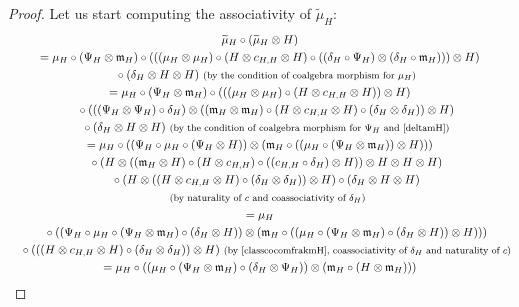 \documentclass[10pt,a4paper]{amsart}
\numberwithin{equation}{section}
\begin{document}
\begin{proof}
Let us start computing the associativity of $\widetilde{\mu}_{H}$:
\begin{gather*}
\widetilde{\mu}_{H}\circ(\widetilde{\mu}_{H}\otimes H)\\
= \mu_{H}\circ(\Psi_{H}\otimes \mathfrak{m}_{H})\circ(((\mu_{H}\otimes\mu_{H})\circ(H\otimes c_{H,H}\otimes H)\circ((\delta_{H}\circ\Psi_{H})\otimes(\delta_{H}\circ \mathfrak{m}_{H})))\otimes H)\\
\quad{}\circ(\delta_{H}\otimes H\otimes H)\ \text{\footnotesize\textnormal{(by the condition of coalgebra morphism for $\mu_{H}$)}}\\
= \mu_{H}\circ(\Psi_{H}\otimes \mathfrak{m}_{H})\circ (((\mu_{H}\otimes \mu_{H})\circ(H\otimes c_{H,H}\otimes H))\otimes H)\\
\quad{}\circ (((\Psi_{H}\otimes \Psi_{H})\circ\delta_{H})\otimes((\mathfrak{m}_{H}\otimes \mathfrak{m}_{H})\circ(H\otimes c_{H,H}\otimes H)\circ(\delta_{H}\otimes\delta_{H}))\otimes H)\\
\quad{}\circ(\delta_{H}\otimes H\otimes H)\ \text{\footnotesize\textnormal{(by the condition of coalgebra morphism for $\Psi_{H}$ and \eqref{deltamH})}}\\
= \mu_{H}\circ ((\Psi_{H}\circ\mu_{H}\circ(\Psi_{H}\otimes H))\otimes(\mathfrak{m}_{H}\circ((\mu_{H}\circ(\Psi_{H}\otimes \mathfrak{m}_{H}))\otimes H)))\\
\quad{}\circ(H\otimes ((\mathfrak{m}_{H}\otimes H)\circ (H\otimes c_{H,H})\circ((c_{H,H}\circ\delta_{H})\otimes H))\otimes H\otimes H\otimes H)\\
\quad{}\circ(H\otimes((H\otimes c_{H,H}\otimes H)\circ(\delta_{H}\otimes\delta_{H}))\otimes H)\circ(\delta_{H}\otimes H\otimes H)\\
\quad{}\ \text{\footnotesize\textnormal{(by naturality of $c$ and coassociativity of $\delta_{H}$)}}\\
= \mu_{H}\\
\quad{}\circ((\Psi_{H}\circ\mu_{H}\circ (\Psi_{H}\otimes \mathfrak{m}_{H})\circ(\delta_{H}\otimes H))\otimes(\mathfrak{m}_{H}\circ((\mu_{H}\circ(\Psi_{H}\otimes \mathfrak{m}_{H})\circ(\delta_{H}\otimes H))\otimes H)))\\
\quad{} \circ(((H\otimes c_{H,H}\otimes H)\circ(\delta_{H}\otimes\delta_{H}))\otimes H)\ \text{\footnotesize\textnormal{(by \eqref{classcocomfrakmH}, coassociativity of $\delta_{H}$ and naturality of $c$)}}\\
= \mu_{H}\circ((\mu_{H}\circ (\Psi_{H}\otimes \mathfrak{m}_{H})\circ(\delta_{H}\otimes \Psi_{H}))\otimes(\mathfrak{m}_{H}\circ(H\otimes \mathfrak{m}_{H})))\\

\end{gather*}
\end{proof}
\end{document}
